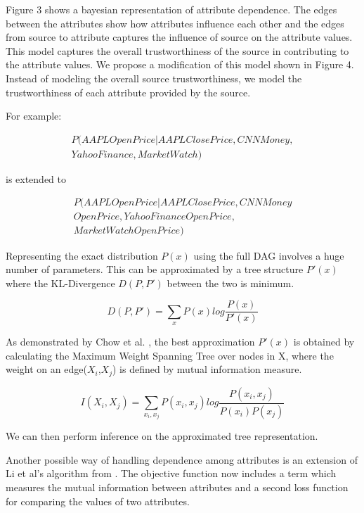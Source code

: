 \documentclass{acm_proc_article-sp}
\begin{document}
Figure 3 shows a bayesian representation of attribute dependence. The edges between the attributes show how attributes influence each other and the edges from source to attribute captures the influence of source on the attribute values. This model captures the overall trustworthiness of the source in contributing to the attribute values.  We propose a modification of this model shown in Figure 4. Instead of modeling the overall source trustworthiness, we model the trustworthiness of each attribute provided by the source. 

For example:


\begin{align}
P(AAPL Open Price|AAPL Close Price, CNN Money,\nonumber  
\\Yahoo Finance, Market Watch) 
\end{align}

is extended to 

\begin{align}
P(AAPL Open Price|AAPL Close Price, CNN Money \nonumber  
\\Open Price,Yahoo Finance Open Price, \nonumber  
\\Market Watch Open Price) 
\end{align}

Representing the exact distribution $P(x)$ using the full DAG involves a huge number of parameters. This can be approximated by a tree structure $P'(x)$ where the KL-Divergence $D(P,P')$ between the two is minimum.  

\begin{equation}
D(P,P') = \sum_x P(x) log \frac{P(x)}{P'(x)}
\end{equation}

As demonstrated by Chow et al. \cite{chow1968approximating}, the best approximation $P'(x)$ is obtained by calculating the Maximum Weight Spanning Tree over nodes in X, where the weight on an edge($X_i$,$X_j$) is  defined by mutual information measure. 

\begin{equation}
I(X_i,X_j) = \sum_{x_i,x_j} P(x_i,x_j) log\frac{P(x_i,x_j)}{P(x_i) P(x_j)}
\end{equation}

We can then perform inference on the approximated tree representation.

Another possible way of handling dependence among attributes is an extension of Li et al's algorithm from \cite{li:resolving}. The objective function now includes a term which measures the mutual information between attributes and a second loss function for comparing the values of two attributes.  
\end{document}
